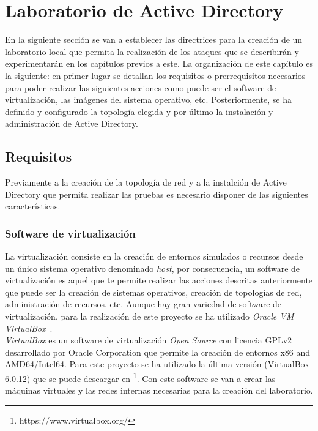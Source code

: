 \section{Laboratorio de Active Directory}

En la siguiente sección se van a establecer las directrices para la creación de un laboratorio local que permita la realización de los ataques que se describirán y ex\-pe\-ri\-men\-ta\-rán en los capítulos previos a este. La organización de este capítulo es la siguiente: en primer lugar se detallan los requisitos o prerrequisitos necesarios para poder realizar las siguientes acciones como puede ser el software de virtualización, las imágenes del sistema operativo, etc. Posteriormente, se ha definido y configurado la topología elegida y por último la instalación y administración de Active Directory. 

\subsection{Requisitos}

Previamente a la creación de la topología de red y a la instalción de Active Directory que permita realizar las pruebas es necesario disponer de las siguientes características.

\subsubsection{Software de virtualización}

La virtualización consiste en la creación de entornos simulados o recursos desde un único sistema operativo denominado {\it host}, por consecuencia, un software de virtualización es aquel que te permite realizar las acciones descritas anteriormente que puede ser la creación de sistemas operativos, creación de topologías de red, administración de recursos, etc. Aunque hay gran variedad de software de virtualización, para la realización de este proyecto se ha utilizado {\it Oracle VM VirtualBox}~\cite{Capitulo4:VirtualBox}.\\

{\it VirtualBox} es un software de virtualización {\it Open Source} con licencia GPLv2 desarrollado por Oracle Corporation que permite la creación de entornos x86 and AMD64/Intel64. Para este proyecto se ha utilizado la última versión (VirtualBox 6.0.12) que se puede descargar en \footnote{https://www.virtualbox.org/}. Con este software se van a crear las máquinas virtuales y las redes internas necesarias para la creación del laboratorio. 

